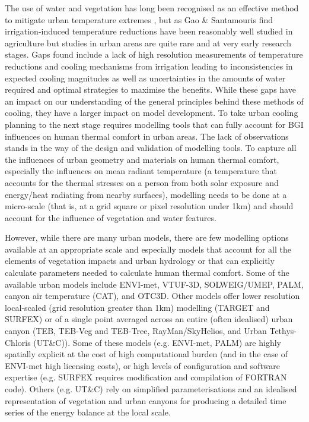 The use of water and vegetation has long been recognised as an effective method to mitigate urban temperature extremes \cite{Coutts2012,Bowler2010}, but as Gao \& Santamouris \cite{Gao2019} find irrigation-induced temperature reductions have been reasonably well studied in agriculture but studies in urban areas are quite rare and at very early research stages. Gaps found include a lack of high resolution measurements of temperature reductions and cooling mechanisms from irrigation leading to inconsistencies in expected cooling magnitudes as well as uncertainties in the amounts of water required and optimal strategies to maximise the benefits. While these gaps have an impact on our understanding of the general principles behind these methods of cooling, they have a larger impact on model development. To take urban cooling planning to the next stage requires modelling tools that can fully account for BGI influences on human thermal comfort in urban areas. The lack of observations stands in the way of the design and validation of modelling tools. To capture all the influences of urban geometry and materials on human thermal comfort, especially the influences on mean radiant temperature\cite{Kantor2011} (a temperature that accounts for the thermal stresses on a person from both solar exposure and energy/heat radiating from nearby surfaces), modelling needs to be done at a micro-scale (that is, at a grid square or pixel resolution under 1km) and should account for the influence of vegetation and water features. 

However, while there are many urban models, there are few modelling options available at an appropriate scale and especially models that account for all the elements of vegetation impacts and urban hydrology or that can explicitly calculate parameters needed to calculate human thermal comfort. Some of the available urban models include ENVI-met\cite{Bruse1999}, VTUF-3D\cite{Nice2018a}, SOLWEIG/UMEP\cite{Lindberg2018}, PALM\cite{Dominik2019}, canyon air temperature (CAT)\cite{Erell2006}, and OTC3D\cite{Nazarian2018}. Other models offer lower resolution local-scaled (grid resolution greater than 1km) modelling (TARGET\cite{Broadbent2019c} and SURFEX\cite{Masson2013}) or of a single point averaged across an entire (often idealised) urban canyon (TEB\cite{Masson2002a},  TEB-Veg and TEB-Tree\cite{Lemonsu2012,Redon2020}, RayMan\cite{Matzarakis2010}/SkyHelios\cite{Matzarakis2011}, and Urban Tethys-Chloris (UT\&C)\cite{Meili2020}). Some of these models (e.g. ENVI-met, PALM) are highly spatially explicit at the cost of high computational burden (and in the case of ENVI-met high licensing costs), or high levels of configuration and software expertise (e.g. SURFEX requires modification and compilation of FORTRAN code). Others (e.g. UT\&C) rely on simplified parameterisations and an idealised representation of vegetation and urban canyons for producing a detailed time series of the energy balance at the local scale. 

